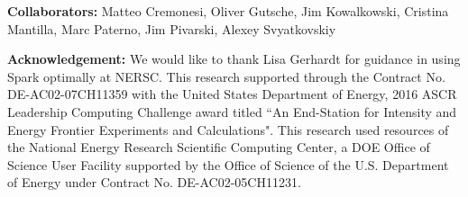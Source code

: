\documentclass[10pt, twocolumn]{article}
\begin{document}
\textbf{Collaborators: } 
Matteo Cremonesi, Oliver Gutsche, Jim Kowalkowski, 
Cristina Mantilla, Marc Paterno, Jim Pivarski, Alexey Svyatkovskiy

\textbf{Acknowledgement: }
We would like to thank Lisa Gerhardt for guidance in using Spark optimally at NERSC. 
This research supported through the  Contract No. DE-AC02-07CH11359 with the United States Department of Energy, 2016 ASCR Leadership Computing Challenge award titled ``An End-Station for Intensity and Energy Frontier Experiments and Calculations". This research used resources of the National Energy Research Scientific Computing Center, a DOE Office of Science User Facility supported by the Office of Science of the U.S. Department of Energy under Contract No. DE-AC02-05CH11231.
\scriptsize


\end{document}
